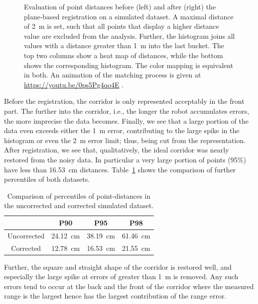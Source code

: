 \begin{figure}
\begin{minipage}[c]{0.495\textwidth}
  	\end{minipage} 	
 	\caption{Evaluation of point distances before (left) and after (right) the plane-based registration on a simulated dataset. A maximal distance of \SI{2}{m} is set, such that all points that display a higher distance value are excluded from the analysis. Further, the histogram joins all values with a distance greater than \SI{1}{m} into the last bucket. The top two columns show a heat map of distances, while the bottom shows the corresponding histogram. The color mapping is equivalent in both. An animation of the matching process is given at \url{https://youtu.be/0ps5Pg4qo4E} .}
 	\label{fig:simulatedEvaluation}
\end{figure} 

Before the registration, the corridor is only represented acceptably in the front part. 
The further into the corridor, i.e., the longer the robot accumulates errors, the more imprecise the data becomes. 
Finally, we see that a large portion of the data even exceeds either the \SI{1}{\meter} error, contributing to the large spike in the histogram or even the \SI{2}{\meter} error limit; thus, being cut from the representation. 
After registration, we see that, qualitatively, the ideal corridor was nearly restored from the noisy data. 
In particular a very large portion of points (95\%) have less than \SI{16.53}{\centi\meter} distances.
Table~\ref{tab:percentiles} shows the comparison of further percentiles of both datasets.

\begin{table}
	\centering
	\begin{tabular}{@{}cccc@{}}\hline
		& P90 & P95 & P98\\ \hline\hline
		Uncorrected & \SI{24.12}{\centi\meter} &  \SI{38.19}{\centi\meter} &  \SI{61.46}{\centi\meter}\\
		Corrected & \SI{12.78}{\centi\meter} &  \SI{16.53}{\centi\meter} &  \SI{21.55}{\centi\meter}\\ \hline
	\end{tabular}
	\caption{Comparison of percentiles of point-distances in the uncorrected and corrected simulated dataset.}
	\label{tab:percentiles}
\end{table}

Further, the square and straight shape of the corridor is restored well, and especially the large spike at errors of greater than \SI{1}{m} is removed. 
Any such errors tend to occur at the back and the front of the corridor where the measured range is the largest hence has the largest contribution of the range error. 

